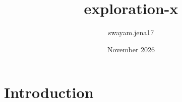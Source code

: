\documentclass{article}
\title{exploration-x}
\author{swayam.jena17 }
\date{November 2026}
\begin{document}
\maketitle

\section{Introduction}
\end{document}
